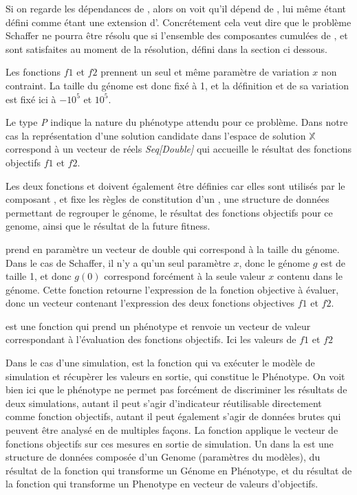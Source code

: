 Si on regarde les dépendances de , alors on voit qu'il dépend de , lui même étant défini comme étant une extension d'. Concrétement cela veut dire que le problème Schaffer ne pourra être résolu que si l'ensemble des composantes cumulées de  ,  et  sont satisfaites au moment de la résolution, défini dans la section ci dessous.

Les fonctions $f1$ et $f2$ prennent un seul et même paramètre de variation $x$ non contraint. La taille  du génome est donc fixé à 1, et la définition  et  de sa variation est fixé ici à $-10^{5}$ et $10^{5}$.

Le type \emph{P} indique la nature du phénotype attendu pour ce problème. Dans notre cas la représentation d'une solution candidate dans l'espace de solution $\mathbb{X}$ correspond à un vecteur de réels \emph{Seq[Double]} qui accueille le résultat des fonctions objectifs $f1$ et $f2$.

Les deux fonctions  et  doivent également être définies car elles sont utilisés par le composant , et fixe les règles de constitution d'un , une structure de données permettant de regrouper le génome, le résultat des fonctions objectifs pour ce genome, ainsi que le résultat de la future fitness.

\begin{itemize}[label=\textbullet, noitemsep, topsep=0pt, parsep=0pt, partopsep=0pt]
 prend en paramètre un vecteur de double qui correspond à la taille du génome. Dans le cas de Schaffer, il n'y a qu'un seul paramètre $x$, donc le génome $g$ est de taille 1, et donc $g(0)$ correspond forcément à la seule valeur $x$ contenu dans le génome. Cette fonction retourne l'expression de la fonction objective à évaluer, donc un vecteur contenant l'expression des deux fonctions objectives $f1$ et $f2$.

 est une fonction qui prend un phénotype et renvoie un vecteur de valeur correspondant à l'évaluation des fonctions objectifs. Ici les valeurs de $f1$ et $f2$

\end{itemize}

Dans le cas d'une simulation,  est la fonction qui va exécuter le modèle de simulation et récupèrer les valeurs en sortie, qui constitue le Phénotype. On voit bien ici que le phénotype ne permet pas forcément de discriminer les résultats de deux simulations, autant il peut s'agir d'indicateur réutilisable directement comme fonction objectifs, autant il peut également s'agir de données brutes qui peuvent être analysé en de multiples façons.  La fonction  applique le vecteur de fonctions objectifs sur ces mesures en sortie de simulation. Un  dans la  est une structure de données composée d'un Genome (paramètres du modèles), du résultat de la fonction  qui transforme un Génome en Phénotype, et du résultat de la fonction  qui transforme un Phenotype en vecteur de valeurs d'objectifs.

